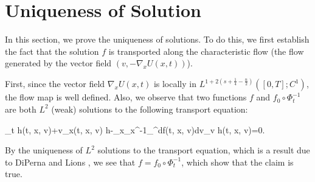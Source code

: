 \documentclass[11pt]{amsart}
\newtheorem{lemma}[theorem]{Lemma}
\theoremstyle{definition}
\theoremstyle{remark}
\numberwithin{equation}{section}
\newcommand{\0}{\emptyset}
\begin{document}
	\section{Uniqueness of Solution}\label{sec:unique}
	 In this section, we prove the uniqueness of solutions. To do this, we first establish the fact that the solution $f$ is transported along the characteristic flow (the flow generated by the vector field $(v, -\nabla_x U(x, t))$). %
	
	
	{
        First, since the vector field $\nabla_x U(x,t)$ is locally in $L^{1+2(s+\frac 14-\frac n2)}([0, T]; C^{{1}})$, the flow map is well defined. Also, we observe that two functions $f$ and $f_0\circ\Phi_t^{-1}$ are both $L^2$ (weak) solutions to the following transport equation:
		\begin{flalign*}
			\partial_t h(t, x, v)+v\cdot \nabla_x(t, x, v) h-\nabla_x\Delta_x^{-1}\int_{^d}f(t, x, v)dv\cdot \nabla_v h(t, x, v)=0.
		\end{flalign*}
		By the uniqueness of $L^2$ solutions to the transport equation, which is a result due to DiPerna and Lions \cite{DPL}, we see that $f=f_0\circ\Phi_t^{-1}$, which show that the claim is true.
	}
	
\end{document}
